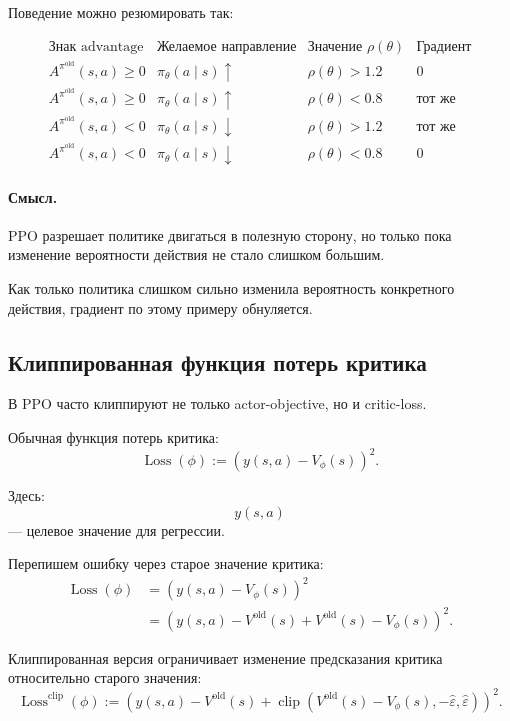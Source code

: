 \documentclass[12pt,a4paper]{article}
\begin{document}
Поведение можно резюмировать так:

\[
\begin{array}{c|c|c|c}
\text{Знак advantage} & \text{Желаемое направление} & \text{Значение }\rho(\theta) & \text{Градиент} \\
\hline
A^{\pi^{\mathrm{old}}}(s,a)\ge 0
&
\pi_\theta(a\mid s)\uparrow
&
\rho(\theta)>1.2
&
0
\\
A^{\pi^{\mathrm{old}}}(s,a)\ge 0
&
\pi_\theta(a\mid s)\uparrow
&
\rho(\theta)<0.8
&
\text{тот же}
\\
A^{\pi^{\mathrm{old}}}(s,a)<0
&
\pi_\theta(a\mid s)\downarrow
&
\rho(\theta)>1.2
&
\text{тот же}
\\
A^{\pi^{\mathrm{old}}}(s,a)<0
&
\pi_\theta(a\mid s)\downarrow
&
\rho(\theta)<0.8
&
0
\end{array}
\]

\paragraph{Смысл.}

PPO разрешает политике двигаться в полезную сторону, но только пока изменение вероятности действия не стало слишком большим.

Как только политика слишком сильно изменила вероятность конкретного действия, градиент по этому примеру обнуляется.

\subsection{Клиппированная функция потерь критика}

В PPO часто клиппируют не только actor-objective, но и critic-loss.

Обычная функция потерь критика:
\[
\operatorname{Loss}(\phi)
:=
\left(
y(s,a)-V_\phi(s)
\right)^2.
\]

Здесь:
\[
y(s,a)
\]
--- целевое значение для регрессии.

Перепишем ошибку через старое значение критика:
\[
\begin{aligned}
\operatorname{Loss}(\phi)
&=
\left(
y(s,a)-V_\phi(s)
\right)^2
\\
&=
\left(
y(s,a)-V^{\mathrm{old}}(s)
+
V^{\mathrm{old}}(s)-V_\phi(s)
\right)^2.
\end{aligned}
\]

Клиппированная версия ограничивает изменение предсказания критика относительно старого значения:
\[
\operatorname{Loss}^{\mathrm{clip}}(\phi)
:=
\left(
y(s,a)-V^{\mathrm{old}}(s)
+
\operatorname{clip}
\left(
V^{\mathrm{old}}(s)-V_\phi(s),
-\hat\varepsilon,
\hat\varepsilon
\right)
\right)^2.
\]
\end{document}
